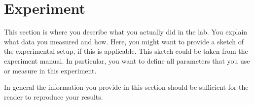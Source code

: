 \section{Experiment}

This section is where you describe what you actually did in the lab.
You explain what data you measured and how. Here, you might want to
provide a sketch of the experimental setup, if this is applicable.
This sketch could be taken from the experiment manual. In particular,
you want to define all parameters that you use or measure in this
experiment.

In general the information you provide in this section should be
sufficient for the reader to reproduce your results.